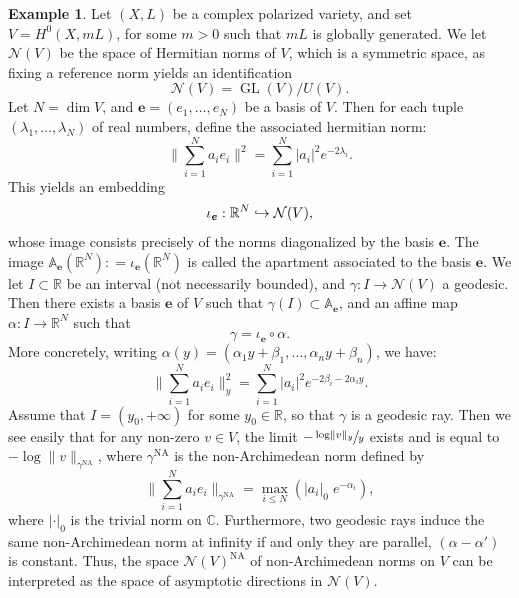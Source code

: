 \documentclass[JEP,XML,SOM,Unicode,published]{cedram}
\newcommand\hto{\mathrel{\lhook\joinrel\to}}
\theoremstyle{definition}
\newtheorem{ex}[equation]{Example}
\newcommand \C{\mathbb C}
\newcommand \R{\mathbb R}
\DeclareMathOperator \GL {GL}
\DeclareMathOperator{\NA}{NA}
\begin{document}
\begin{ex} Let $(X, L)$ be a complex polarized variety, and set $V = H^0(X, mL)$, for some $m>0$ such that $mL$ is globally generated. We let $\mathcal{N}(V)$ be the space of Hermitian norms of $V$, which is a symmetric space, as fixing a reference norm yields an identification
\[
\mathcal{N}(V) = \GL(V) / U(V).
\]
Let $N = \dim V$, and $\boldsymbol{e} = (e_1,\dots,e_N)$ be a basis of $V$. Then for each tuple $(\lambda_1,\dots, \lambda_N)$ of real numbers, define the associated hermitian norm:
\[
\biggl\lVert \sum_{i=1}^N {a_i} e_i \biggr\rVert^2 = \sum_{i=1}^N \lvert a_i \rvert^2 e^{-2\lambda_i}.
\]
This yields an embedding
\[
\iota_{\boldsymbol{e}}: \R^N \hto \mathcal{N}(V),
\]
whose image consists precisely of the norms diagonalized by the basis $\boldsymbol{e}$. The image $\mathbb{A}_{\boldsymbol{e}}(\R^N): = \iota_{\boldsymbol{e}}(\R^N)$ is called the apartment associated to the basis $\boldsymbol{e}$.
We let $I \subset \R$ be an interval (not necessarily bounded), and $\gamma: I \to \mathcal{N}(V)$ a geodesic. Then there exists a basis $\boldsymbol{e}$ of $V$ such that $\gamma(I) \subset \mathbb{A}_{\boldsymbol{e}}$, and an affine map $\alpha: I \to \R^N$ such that
\[
\gamma = \iota_{\boldsymbol{e}} \circ \alpha.
\]
More concretely, writing $\alpha(y) = (\alpha_1 y + \beta_1,\dots, \alpha_n y+\beta_n)$, we have:
\[
\biggl\lVert \sum_{i=1}^N a_i e_i \biggr\rVert_{y}^2 = \sum_{i=1}^N \lvert a_i \rvert^2 e^{-2 \beta_i -2 \alpha_i y}.
\]
Assume that $I = (y_0, + \infty)$ for some $y_0 \in \R$, so that $\gamma$ is a geodesic ray. Then we see easily that for any non-zero $v \in V$, the limit $- \sfrac{\log \lVert v \rVert_y }{y}$ exists and is equal to $- \log \lVert v \rVert_{\gamma^{\NA}}$, where $\gamma^{\NA}$ is the non-Archimedean norm defined by
\[
\biggl\lVert \sum_{i=1}^N {a_i} e_i \biggr\rVert_{\gamma^{\NA}} = \max_{i \le N} (\lvert a_i \rvert_0 \; e^{-\alpha_i}),
\]
where $\lvert \cdot \rvert_0$ is the trivial norm on $\C$. Furthermore, two geodesic rays induce the same non-Archimedean norm at infinity if and only they are parallel, \ie $(\alpha - \alpha')$ is constant. Thus, the space $\mathcal{N}(V)^{\NA}$ of non-Archimedean norms on $V$ can be interpreted as the space of asymptotic directions in $\mathcal{N}(V)$.


\end{ex}
\end{document}
